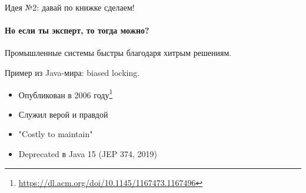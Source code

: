 \begin{frame}[t,noframenumbering]{Идея №2: давай по книжке сделаем!}
\framesubtitle{Но если ты эксперт, то тогда можно?}

Промышленные системы быстры благодаря хитрым решениям.

Пример из Java-мира: biased locking.

\begin{itemize}
 \item Опубликован в 2006 году\footnote{\tiny\url{https://dl.acm.org/doi/10.1145/1167473.1167496}}

 \pause
 \item Служил верой и правдой

 \pause
 \item "Costly to maintain"

 \pause
 \item Deprecated в Java 15 (JEP 374, 2019)

\end{itemize}

\pause



\end{frame}


